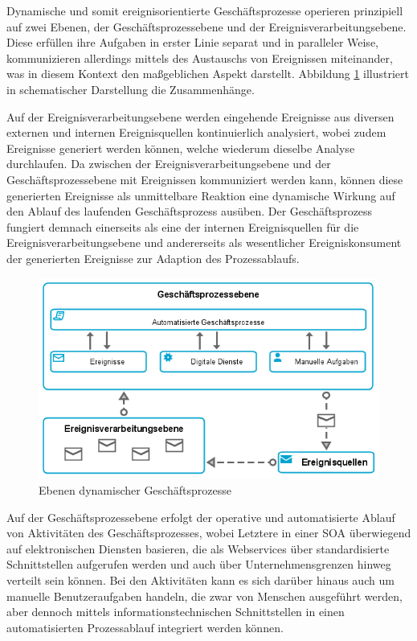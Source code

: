 Dynamische und somit ereignisorientierte Geschäftsprozesse operieren prinzipiell auf zwei Ebenen, der Geschäftsprozessebene und der Ereignisverarbeitungsebene. 
Diese erfüllen ihre Aufgaben in erster Linie separat und in paralleler Weise, kommunizieren allerdings mittels des Austauschs von Ereignissen miteinander, was in diesem Kontext den maßgeblichen Aspekt darstellt. Abbildung \ref{fig:Ebenen dynamischer Geschäftsprozesse} illustriert in schematischer Darstellung die Zusammenhänge.

Auf der Ereignisverarbeitungsebene werden eingehende Ereignisse aus diversen externen und internen Ereignisquellen kontinuierlich analysiert, wobei zudem Ereignisse generiert werden können, welche wiederum dieselbe Analyse durchlaufen. 
Da zwischen der Ereignisverarbeitungsebene und der Geschäftsprozessebene mit Ereignissen kommuniziert werden kann, können diese generierten Ereignisse als unmittelbare Reaktion eine dynamische Wirkung auf den Ablauf des laufenden Geschäftsprozess ausüben.
Der Geschäftsprozess fungiert demnach einerseits als eine der internen Ereignisquellen für die Ereignisverarbeitungsebene und andererseits als wesentlicher Ereigniskonsument der generierten Ereignisse zur Adaption des Prozessablaufs.

\begin{figure}[H]
	\centering 
    \includegraphics[width=\textwidth]{img/dynamicbp.png}	
    \caption[Ebenen dynamischer Geschäftsprozesse]
    {Ebenen dynamischer Geschäftsprozesse \protect\footnotemark}
    \label{fig:Ebenen dynamischer Geschäftsprozesse}
\end{figure}

Auf der Geschäftsprozessebene erfolgt der operative und automatisierte Ablauf von Aktivitäten des Geschäftsprozesses, wobei Letztere in einer \ac{SOA} überwiegend auf elektronischen Diensten basieren, die als Webservices über standardisierte Schnittstellen aufgerufen werden und auch über Unternehmensgrenzen hinweg verteilt sein können.
Bei den Aktivitäten kann es sich darüber hinaus auch um manuelle Benutzeraufgaben handeln, die zwar von Menschen ausgeführt werden, aber dennoch mittels informationstechnischen Schnittstellen in einen automatisierten Prozessablauf integriert werden können.

